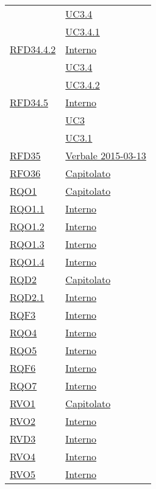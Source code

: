 \begin{longtable}{|>{\centering}m{5cm}|m{5cm}<{\centering}|}
& \hyperref[UC3.4]{UC3.4}\\
& \hyperref[UC3.4.1]{UC3.4.1}\\ \hline
\hyperlink{RFD34.4.2}{RFD34.4.2} & \hyperlink{Interno}{Interno}\\
& \hyperref[UC3.4]{UC3.4}\\
& \hyperref[UC3.4.2]{UC3.4.2}\\ \hline
\hyperlink{RFD34.5}{RFD34.5} & \hyperlink{Interno}{Interno}\\
& \hyperref[UC3]{UC3}\\
& \hyperref[UC3.1]{UC3.1}\\ \hline
\hyperlink{RFD35}{RFD35} & \hyperlink{Verbale 2015-03-13}{Verbale 2015-03-13}\\ \hline
\hyperlink{RFO36}{RFO36} & \hyperlink{Capitolato}{Capitolato}\\ \hline
\hyperlink{RQO1}{RQO1} & \hyperlink{Capitolato}{Capitolato}\\ \hline
\hyperlink{RQO1.1}{RQO1.1} & \hyperlink{Interno}{Interno}\\ \hline
\hyperlink{RQO1.2}{RQO1.2} & \hyperlink{Interno}{Interno}\\ \hline
\hyperlink{RQO1.3}{RQO1.3} & \hyperlink{Interno}{Interno}\\ \hline
\hyperlink{RQO1.4}{RQO1.4} & \hyperlink{Interno}{Interno}\\ \hline
\hyperlink{RQD2}{RQD2} & \hyperlink{Capitolato}{Capitolato}\\ \hline
\hyperlink{RQD2.1}{RQD2.1} & \hyperlink{Interno}{Interno}\\ \hline
\hyperlink{RQF3}{RQF3} & \hyperlink{Interno}{Interno}\\ \hline
\hyperlink{RQO4}{RQO4} & \hyperlink{Interno}{Interno}\\ \hline
\hyperlink{RQO5}{RQO5} & \hyperlink{Interno}{Interno}\\ \hline
\hyperlink{RQF6}{RQF6} & \hyperlink{Interno}{Interno}\\ \hline
\hyperlink{RQO7}{RQO7} & \hyperlink{Interno}{Interno}\\ \hline
\hyperlink{RVO1}{RVO1} & \hyperlink{Capitolato}{Capitolato}\\ \hline
\hyperlink{RVO2}{RVO2} & \hyperlink{Interno}{Interno}\\ \hline
\hyperlink{RVD3}{RVD3} & \hyperlink{Interno}{Interno}\\ \hline
\hyperlink{RVO4}{RVO4} & \hyperlink{Interno}{Interno}\\ \hline
\hyperlink{RVO5}{RVO5} & \hyperlink{Interno}{Interno}\\ \hline

\end{longtable}
